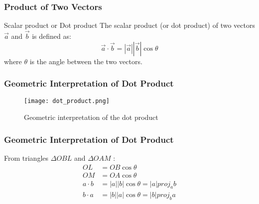 \begin{frame}
    \frametitle{Product of Two Vectors}
    \begin{block}{Scalar product or Dot product}
        The scalar product (or dot product) of two vectors \(\vec{a}\) and \(\vec{b}\) is defined as:
        \[
        \vec{a} \cdot \vec{b} = |\vec{a}| |\vec{b}| \cos \theta
        \]
        where \(\theta\) is the angle between the two vectors.
        
    \end{block}
\end{frame}

\begin{frame}
    \frametitle{Geometric Interpretation of Dot Product}
    \begin{figure}
        \centering
        \texttt{[image: dot\_product.png]}
        \caption{Geometric interpretation of the dot product}
    \end{figure}

\end{frame}

\begin{frame}
    \frametitle{Geometric Interpretation of Dot Product}
    From triangles \(\Delta OBL \) and \(\Delta OAM \) :
    \begin{align*}
        OL &= OB \cos \theta \\
        OM &= OA \cos \theta  \\
        a \cdot b  &= |a| |b| \cos \theta = |a| proj_a b \\
        b \cdot a  &= |b| |a| \cos \theta = |b| proj_b a \\
    \end{align*}
\end{frame} 

